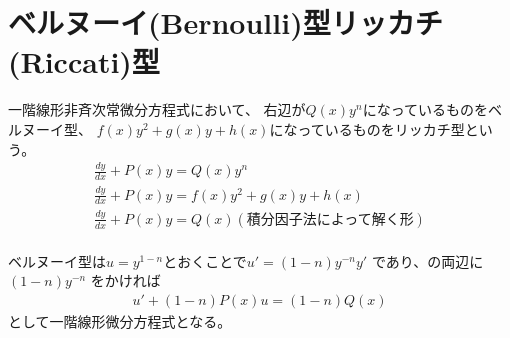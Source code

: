 \section{ベルヌーイ(Bernoulli)型\cdot リッカチ(Riccati)型}
一階線形非斉次常微分方程式において、
右辺が$Q(x)y^n$になっているものをベルヌーイ型、
$f(x)y^2 + g(x)y + h(x)$になっているものをリッカチ型という。
\begin{gather}
  \frac{dy}{dx} + P(x)y = Q(x)y^n \label{eq:appendix-ODE-Bernoulli} \\
  \frac{dy}{dx} + P(x)y = f(x)y^2 + g(x)y + h(x) \label{eq:appendix-ODE-Riccati}\\
  \frac{dy}{dx} + P(x)y = Q(x) (\text{積分因子法によって解く形})\\
\end{gather}

ベルヌーイ型は$u=y^{1-n}$とおくことで$u'=(1-n)y^{-n}y'$
であり、の両辺に$(1-n)y^{-n}$
をかければ
\begin{gather}
  u' + (1-n)P(x)u = (1-n)Q(x)
\end{gather}
として一階線形微分方程式となる。


